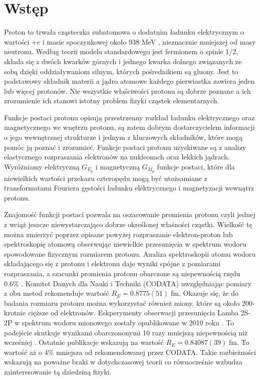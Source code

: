 \documentclass[11pt]{book}
\theoremstyle{definition}
\begin{document}
\tableofcontents
{}
\chapter{Wstęp}

Proton to trwała cząsteczka subatomowa o dodatnim ładunku elektrycznym o wartości $+e$ i masie spoczynkowej około 938 MeV \cite{2012RvMP...84.1527M}, nieznacznie mniejszej od masy neutronu. Według teorii modelu standardowego jest fermionem o spinie 1/2, składa się z dwóch kwarków górnych i jednego kwarka dolnego związanych ze sobą dzięki oddziaływaniom silnym, których pośrednikiem są gluony. Jest to podstawowy składnik materii a jądro atomowe każdego pierwiastka zawiera jeden lub więcej protonów. Nie wszystkie właściwości protonu są dobrze poznane a ich zrozumienie ich stanowi istotny problem fizyki cząstek elementarnych.

Funkcje postaci protonu opisują przestrzenny rozkład ładunku elektrycznego oraz magnetycznego we wnętrzu protonu, są zatem dobrym dostarczycielem informacji o jego wewnętrznej strukturze i jednym z kluczowych składników, które mogą pomóc ją poznać i zrozumieć. Funkcje postaci protonu uzyskiwane są z analizy elastycznego rozpraszania elektronów na nukleonach oraz lekkich jądrach. Wyróżniamy elektryczną $G_{E_p}$ i magnetyczną $G_{M_p}$ funkcje postaci, które dla niewielkich wartości przekazu czteropędu mogą być utożsamiane z transformatami Fouriera gęstości ładunku elektrycznego i magnetyzacji wewnątrz protonu. 

Znajomość funkcji postaci pozwala na oszacowanie promienia protonu czyli jednej z wciąż jeszcze niewystarczająco dobrze określonej właśności cząstki. Wielkość tę można zmierzyć poprzez opisane powyżej rozpraszanie elektron-proton lub spektroskopię atomową obserwując niewielkie przesunięcia w spektrum wodoru spowodowane fizycznym rozmiarem protonu. Analiza spektroskopii atomu wodoru składającego się z protonu i elektronu daje wyniki spójne z pomiarami rozpraszania, a szacunki promienia protonu obarczone są niepewnością rzędu 0.6\% \cite{Carlson:2015jba}. Komitet Danych dla Nauki i Techniki (CODATA) uwzględniając pomiary z obu metod rekomenduje wartość \cite{2012RvMP...84.1527M} $R_E = 0.8775(51) \; \text{fm}$. Okazuje się, że do badania rozmiaru protonu można wykorzystać również miony, które są około 200-krotnie cięższe od elektronów. Eskperymenty obserwacji przesunięcia Lamba 2S-2P w spektrum wodoru mionowego zostały opublikowane w 2010 roku \cite{2010Nature..Pohl}. To podejście skutkuje wynikami obarczononymi 10 razy mniejszą niepewnością niż wcześniej \cite{Carlson:2015jba}. Ostatnie publikacje  \cite{Antognini417} wskazują na wartość $R_E = 0.84087(39) \; \text{fm}.$ To wartość aż o 4\% mniejsza od rekomendowanej przez CODATA. Takie rozbieżności wskazują na poważne braki w dotychczasowej teorii co równocześnie wzbudza zainteresowanie tą dziedziną fizyki.
\end{document}

